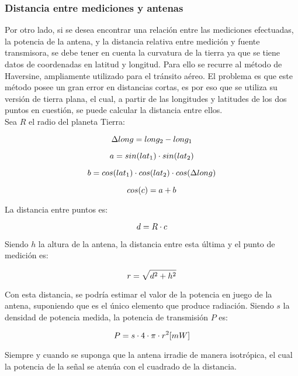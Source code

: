 \subsubsection*{Distancia entre mediciones y antenas}
Por otro lado, si se desea encontrar una relación entre las mediciones efectuadas, la potencia de la antena, y la distancia relativa entre medición y fuente transmisora, se debe tener en cuenta la curvatura de la tierra ya que se tiene datos de coordenadas en latitud y longitud. Para ello se recurre al método de Haversine, ampliamente utilizado para el tránsito aéreo. El problema es que este método posee un gran error en distancias cortas, es por eso que se utiliza su versión de tierra plana, el cual, a partir de las longitudes y latitudes de los dos puntos en cuestión, se puede calcular la distancia entre ellos. \\

Sea $R$ el radio del planeta Tierra:


\begin{equation}
\notag
    \Delta long = long_2-long_1
\end{equation}

\begin{equation}
\notag
    a = sin(lat_1)\cdot sin(lat_2)
\end{equation}

\begin{equation}
\notag
    b = cos(lat_1)\cdot cos(lat_2)\cdot cos(\Delta long)
\end{equation}

\begin{equation}
\notag
    cos(c) = a + b
\end{equation}

La distancia entre puntos es:

\begin{equation}
\notag
    d = R\cdot c
\end{equation}

Siendo $h$ la altura de la antena, la distancia entre esta última y el punto de medición es:

\begin{equation}
\notag
    r = \sqrt{d^2 +h^2}
\end{equation}

Con esta distancia, se podría estimar el valor de la potencia en juego de la antena, suponiendo que es el único elemento que produce radiación. Siendo $s$ la densidad de potencia medida, la potencia de transmisión $P$ es:

\begin{equation}
\notag
    P = s\cdot 4\cdot \pi \cdot r^2 [mW]
\end{equation}

Siempre y cuando se suponga que la antena irradie de manera isotrópica, el cual la potencia de la señal se atenúa con el cuadrado de la distancia. 